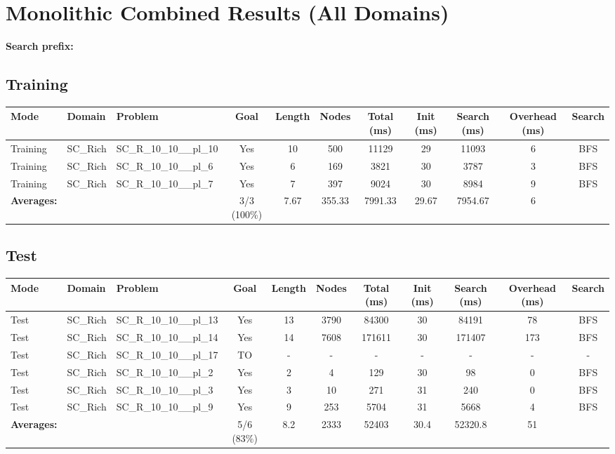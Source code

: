 \documentclass{article}
\begin{document}
\section*{Monolithic Combined Results (All Domains)}
\textbf{Search prefix:} 
\\[0.5cm]
\subsection*{Training}
\begin{tabular}{lllcccccccc}
\toprule
Mode & Domain & Problem & Goal & Length & Nodes & Total (ms) & Init (ms) & Search (ms) & Overhead (ms) & Search \\
\midrule
Training & SC\_Rich & SC\_R\_10\_10\_\_pl\_10 & Yes & 10 & 500 & 11129 & 29 & 11093 & 6 & BFS \\
Training & SC\_Rich & SC\_R\_10\_10\_\_pl\_6 & Yes & 6 & 169 & 3821 & 30 & 3787 & 3 & BFS \\
Training & SC\_Rich & SC\_R\_10\_10\_\_pl\_7 & Yes & 7 & 397 & 9024 & 30 & 8984 & 9 & BFS \\
\textbf{Averages:} & & & 3/3 (100\%) & 7.67 & 355.33 & 7991.33 & 29.67 & 7954.67 & 6 & \\
\bottomrule
\end{tabular}
\newpage
\subsection*{Test}
\begin{tabular}{lllcccccccc}
\toprule
Mode & Domain & Problem & Goal & Length & Nodes & Total (ms) & Init (ms) & Search (ms) & Overhead (ms) & Search \\
\midrule
Test & SC\_Rich & SC\_R\_10\_10\_\_pl\_13 & Yes & 13 & 3790 & 84300 & 30 & 84191 & 78 & BFS \\
Test & SC\_Rich & SC\_R\_10\_10\_\_pl\_14 & Yes & 14 & 7608 & 171611 & 30 & 171407 & 173 & BFS \\
Test & SC\_Rich & SC\_R\_10\_10\_\_pl\_17 & TO & - & - & - & - & - & - & - \\
Test & SC\_Rich & SC\_R\_10\_10\_\_pl\_2 & Yes & 2 & 4 & 129 & 30 & 98 & 0 & BFS \\
Test & SC\_Rich & SC\_R\_10\_10\_\_pl\_3 & Yes & 3 & 10 & 271 & 31 & 240 & 0 & BFS \\
Test & SC\_Rich & SC\_R\_10\_10\_\_pl\_9 & Yes & 9 & 253 & 5704 & 31 & 5668 & 4 & BFS \\
\textbf{Averages:} & & & 5/6 (83\%) & 8.2 & 2333 & 52403 & 30.4 & 52320.8 & 51 & \\
\bottomrule
\end{tabular}
\newpage
\end{document}
